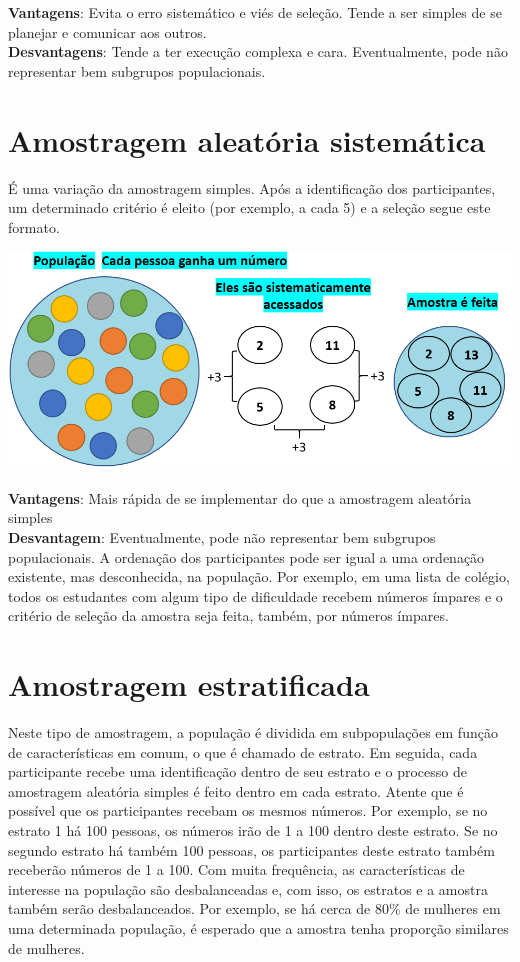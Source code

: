 \documentclass[
]{book}
\begin{document}
\textbf{Vantagens}: Evita o erro sistemático e viés de seleção. Tende a ser simples de se planejar e comunicar aos outros.\\
\textbf{Desvantagens}: Tende a ter execução complexa e cara. Eventualmente, pode não representar bem subgrupos populacionais.

\hypertarget{amostragem-aleatuxf3ria-sistemuxe1tica}{%
\section{Amostragem aleatória sistemática}\label{amostragem-aleatuxf3ria-sistemuxe1tica}}

É uma variação da amostragem simples. Após a identificação dos participantes, um determinado critério é eleito (por exemplo, a cada 5) e a seleção segue este formato.

\includegraphics{./img/cap_a_sistematica.png}

\textbf{Vantagens}: Mais rápida de se implementar do que a amostragem aleatória simples\\
\textbf{Desvantagem}: Eventualmente, pode não representar bem subgrupos populacionais. A ordenação dos participantes pode ser igual a uma ordenação existente, mas desconhecida, na população. Por exemplo, em uma lista de colégio, todos os estudantes com algum tipo de dificuldade recebem números ímpares e o critério de seleção da amostra seja feita, também, por números ímpares.

\hypertarget{amostragem-estratificada}{%
\section{Amostragem estratificada}\label{amostragem-estratificada}}

Neste tipo de amostragem, a população é dividida em subpopulações em função de características em comum, o que é chamado de estrato. Em seguida, cada participante recebe uma identificação dentro de seu estrato e o processo de amostragem aleatória simples é feito dentro em cada estrato. Atente que é possível que os participantes recebam os mesmos números. Por exemplo, se no estrato 1 há 100 pessoas, os números irão de 1 a 100 dentro deste estrato. Se no segundo estrato há também 100 pessoas, os participantes deste estrato também receberão números de 1 a 100. Com muita frequência, as características de interesse na população são desbalanceadas e, com isso, os estratos e a amostra também serão desbalanceados. Por exemplo, se há cerca de 80\% de mulheres em uma determinada população, é esperado que a amostra tenha proporção similares de mulheres.
\end{document}
